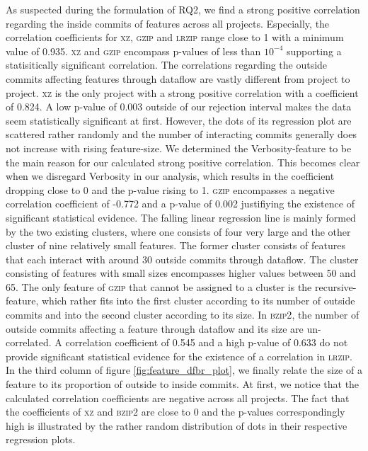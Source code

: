 As suspected during the formulation of RQ2, we find a strong positive correlation regarding the inside commits of features across all projects.
Especially, the correlation coefficients for \textsc{xz}, \textsc{gzip} and \textsc{lrzip} range close to 1 with a minimum value of 0.935.
\textsc{xz} and \textsc{gzip} encompass p-values of less than $10^{-4}$ supporting a statisitically significant correlation.
The correlations regarding the outside commits affecting features through dataflow are vastly different from project to project.
\textsc{xz} is the only project with a strong positive correlation with a coefficient of 0.824.
A low p-value of 0.003 outside of our rejection interval makes the data seem statistically significant at first.
However, the dots of its regression plot are scattered rather randomly and the number of interacting commits generally does not increase with rising feature-size.
We determined the \textsf{Verbosity}-feature to be the main reason for our calculated strong positive correlation.
This becomes clear when we disregard \textsf{Verbosity} in our analysis, which results in the coefficient dropping close to 0 and the p-value rising to 1.
\textsc{gzip} encompasses a negative correlation coefficient of -0.772 and a p-value of 0.002 justifiying the existence of significant statistical evidence.
The falling linear regression line is mainly formed by the two existing clusters, where one consists of four very large and the other cluster of nine relatively small features.
The former cluster consists of features that each interact with around 30 outside commits through dataflow.
The cluster consisting of features with small sizes encompasses higher values between 50 and 65.
The only feature of \textsc{gzip} that cannot be assigned to a cluster is the \textsf{recursive}-feature, which rather fits into the first cluster according to its number of outside commits and into the second cluster according to its size.
In \textsc{bzip2}, the number of outside commits affecting a feature through dataflow and its size are un-correlated.
A correlation coefficient of 0.545 and a high p-value of 0.633 do not provide significant statistical evidence for the existence of a correlation in \textsc{lrzip}. \\
In the third column of figure \ref{fig:feature_dfbr_plot}, we finally relate the size of a feature to its proportion of outside to inside commits.
At first, we notice that the calculated correlation coefficients are negative across all projects.
The fact that the coefficients of \textsc{xz} and \textsc{bzip2} are close to 0 and the p-values correspondingly high is illustrated by the rather random distribution of dots in their respective regression plots.

